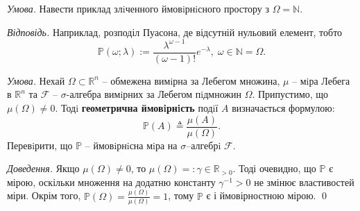 \documentclass[oneside,solution]{karazin-prob-theory-assign}
\begin{document}

\hspace{20px}\textit{Умова.} Навести приклад злiченного ймовiрнiсного простору з $\Omega = \mathbb{N}$.

\textit{Відповідь.} Наприклад, розподіл Пуасона, де відсутній нульовий елемент, тобто
\begin{equation}
    \mathbb{P}(\omega;\lambda) := \frac{\lambda^{\omega-1}}{(\omega-1)!}e^{-\lambda}, \; \omega \in \mathbb{N}=\Omega.
\end{equation}


\hspace{20px}\textit{Умова.} Нехай $\Omega \subset \mathbb{R}^n$ -- обмежена вимiрна за Лебегом множина, $\mu$ – мiра Лебега в $\mathbb{R}^n$ та $\mathcal{F}$ -- $\sigma$-алгебра вимiрних за Лебегом пiдмножин $\Omega$. Припустимо, що $\mu(\Omega) \neq 0$. Тодi \textbf{геометрична ймовiрнiсть} подiї $A$ визначається формулою:
\begin{equation}
    \mathbb{P}(A) \triangleq \frac{\mu(A)}{\mu(\Omega)}.
\end{equation}
Перевiрити, що $\mathbb{P}$ -- ймовiрнiсна мiра на $\sigma$–алгебрi $\mathcal{F}$.

\textit{Доведення.} Якщо $\mu(\Omega)\neq 0$, то $\mu(\Omega) =: \gamma \in \mathbb{R}_{>0}$. Тоді очевидно, що $\mathbb{P}$ є мірою, оскільки множення на додатню константу $\gamma^{-1}>0$ не змінює властивостей міри. Окрім того, $\mathbb{P}(\Omega) = \frac{\mu(\Omega)}{\mu(\Omega)}=1$, тому $\mathbb{P}$ є і ймовірностною мірою. \qed
\end{document}
